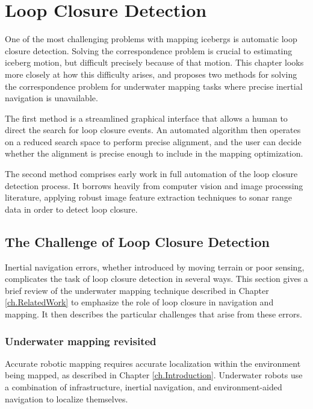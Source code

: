 
\chapter{Loop Closure Detection}
\label{ch.LoopClosure}

One of the most challenging problems with mapping icebergs is automatic loop closure detection. Solving the correspondence problem is crucial to estimating iceberg motion, but difficult precisely because of that motion. This chapter looks more closely at how this difficulty arises, and proposes two methods for solving the correspondence problem for underwater mapping tasks where precise inertial navigation is unavailable. 

The first method is a streamlined graphical interface that allows a human to direct the search for loop closure events. An automated algorithm then operates on a reduced search space to perform precise alignment, and the user can decide whether the alignment is precise enough to include in the mapping optimization.

The second method comprises early work in full automation of the loop closure detection process. It borrows heavily from computer vision and image processing literature, applying robust image feature extraction techniques to sonar range data in order to detect loop closure. 

\section{The Challenge of Loop Closure Detection}

Inertial navigation errors, whether introduced by moving terrain or poor sensing, complicates the task of loop closure detection in several ways. This section gives a brief review of the underwater mapping technique described in Chapter \ref{ch.RelatedWork} to emphasize the role of loop closure in navigation and mapping. It then describes the particular challenges that arise from these errors.

\subsection{Underwater mapping revisited}

Accurate robotic mapping requires accurate localization within the environment being mapped, as described in Chapter \ref{ch.Introduction}. Underwater robots use a combination of infrastructure, inertial navigation, and environment-aided navigation to localize themselves. 

